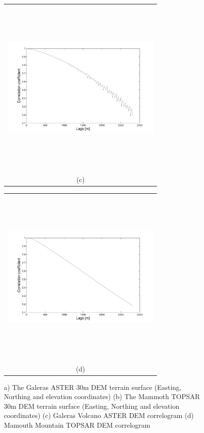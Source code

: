 \documentclass[12pt]{article}
\newcommand{\Pic}[2][0.85]{\begin{center}\texttt{[image: \#2]}
 \end{center} }
\begin{document}
\begin{figure}[H]
\begin{minipage}{0.6\textwidth}
    \end{minipage} 
    \begin{minipage}[b]{0.6\textwidth}
        \begin{tabular}{c}
       \includegraphics[width=8cm,height=9cm,keepaspectratio]{figs_pdf/GalerasAsterCut_correlogram_line.pdf}\\
        (c)
        \end{tabular}
    \end{minipage}
    \begin{minipage}{0.6\textwidth}
        \begin{tabular}{c}
	\includegraphics[width=8cm,height=9cm,keepaspectratio]{figs_pdf/Mammoth30mCut_correlogram_line.pdf}\\
        (d)
        \end{tabular}
    \end{minipage} 

    \caption{a) The Galeras ASTER 30m DEM terrain surface (Easting,
      Northing and elevation coordinates) (b) The Mammoth TOPSAR 30m DEM
      terrain surface (Easting, Northing and elevation coordinates) (c)
      Galeras Volcano ASTER DEM correlogram (d) Mamouth Mountain
      TOPSAR DEM correlogram}
\label{fig2}  
\end{figure}
\end{document}
